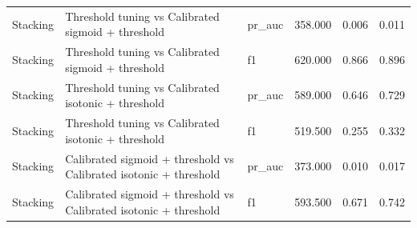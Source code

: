 \begin{tabular}{lllrrr}
Stacking & Threshold tuning vs Calibrated sigmoid + threshold & pr_auc & 358.000 & 0.006 & 0.011 \\
Stacking & Threshold tuning vs Calibrated sigmoid + threshold & f1 & 620.000 & 0.866 & 0.896 \\
Stacking & Threshold tuning vs Calibrated isotonic + threshold & pr_auc & 589.000 & 0.646 & 0.729 \\
Stacking & Threshold tuning vs Calibrated isotonic + threshold & f1 & 519.500 & 0.255 & 0.332 \\
Stacking & Calibrated sigmoid + threshold vs Calibrated isotonic + threshold & pr_auc & 373.000 & 0.010 & 0.017 \\
Stacking & Calibrated sigmoid + threshold vs Calibrated isotonic + threshold & f1 & 593.500 & 0.671 & 0.742 \\
\bottomrule
\end{tabular}
